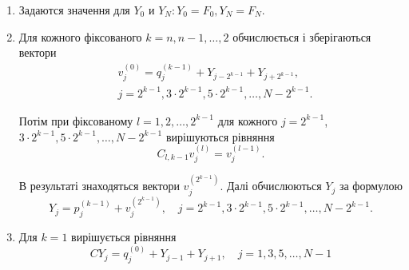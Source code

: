 \begin{enumerate}
    \item Задаются значення для $Y_0$ и $Y_N: Y_0=F_0, Y_N=F_N$.

    \item Для кожного фіксованого $k=n, n-1, \ldots, 2$ обчислюється і зберігаються  
    вектори
    $$
    \begin{aligned}
    & v_j^{(0)}=q_j^{(k-1)}+Y_{j-2^{k-1}}+Y_{j+2^{k-1}}, \\
    & j=2^{k-1}, 3 \cdot 2^{k-1}, 5 \cdot 2^{k-1}, \ldots, N-2^{k-1} .
    \end{aligned}
    $$

    Потім при фіксованому $l=1,2, \ldots, 2^{k-1}$ для кожного $j=2^{k-1}$, $3 \cdot 2^{k-1}, 5 \cdot 2^{k-1}, \ldots, N-2^{k-1}$ вирішуються рівняння
    $$
    C_{l, k-1} v_j^{(l)}=v_j^{(l-1)} .
    $$

    В результаті знаходяться вектори $v_j^{\left(2^{k-1}\right)}$. 
    Далі обчислюються $Y_j$ за формулою
    $$
    Y_j=p_j^{(k-1)}+v_j^{\left(2^{k-1}\right)}, \quad j=2^{k-1}, 3 \cdot 2^{k-1}, 5 \cdot 2^{k-1}, \ldots, N-2^{k-1} .
    $$
    
    \item Для $k=1$ вирішується рівняння
    $$
    C Y_j=q_j^{(0)}+Y_{j-1}+Y_{j+1}, \quad j=1,3,5, \ldots, N-1
    $$

\end{enumerate}
